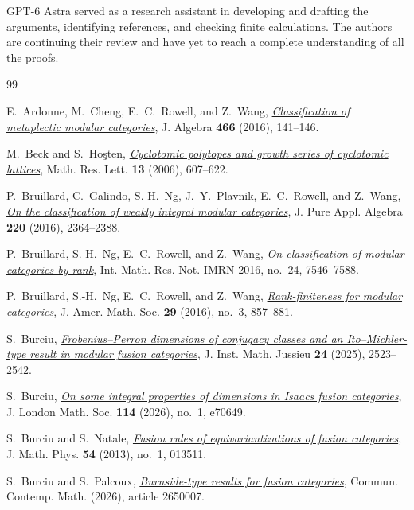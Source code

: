 \documentclass[11pt,a4paper]{article}
\numberwithin{equation}{section}
\theoremstyle{remark}
\begin{document}
GPT-6 Astra served as a research assistant in developing and drafting the arguments, identifying references, and checking finite calculations. The authors are continuing their review and have yet to reach a complete understanding of all the proofs.

\begin{thebibliography}{99}\small{}
E.~Ardonne, M.~Cheng, E.~C.~Rowell, and Z.~Wang,
\href{https://doi.org/10.1016/j.jalgebra.2016.08.001}{\emph{Classification of metaplectic modular categories}},
J. Algebra \textbf{466} (2016), 141--146.

M.~Beck and S.~Ho\c{s}ten, \href{https://doi.org/10.4310/mrl.2006.v13.n4.a10}{\emph{Cyclotomic polytopes and growth series of cyclotomic lattices}}, Math. Res. Lett. \textbf{13} (2006), 607--622.

P.~Bruillard, C.~Galindo, S.-H.~Ng, J.~Y.~Plavnik, E.~C.~Rowell,
and Z.~Wang,
\href{https://doi.org/10.1016/j.jpaa.2015.11.010}{\emph{On the classification of weakly integral modular categories}},
J. Pure Appl. Algebra \textbf{220} (2016), 2364--2388.

P.~Bruillard, S.-H.~Ng, E.~C.~Rowell, and Z.~Wang,
\href{https://doi.org/10.1093/imrn/rnw020}{\emph{On classification of modular categories by rank}},
Int. Math. Res. Not. IMRN 2016, no.~24, 7546--7588.

P.~Bruillard, S.-H.~Ng, E.~C.~Rowell, and Z.~Wang,
\href{https://doi.org/10.1090/jams/842}{\emph{Rank-finiteness for modular categories}},
J. Amer. Math. Soc. \textbf{29} (2016), no.~3, 857--881.

S.~Burciu,
\href{https://doi.org/10.1017/S1474748025101126}{\emph{Frobenius--Perron dimensions of conjugacy classes and an
Ito--Michler-type result in modular fusion categories}},
J. Inst. Math. Jussieu \textbf{24} (2025), 2523--2542.

S.~Burciu,
\href{https://doi.org/10.1112/jlms.70649}{\emph{On some integral properties of dimensions in Isaacs fusion categories}},
J. London Math. Soc. \textbf{114} (2026), no.~1, e70649.

S.~Burciu and S.~Natale,
\href{https://doi.org/10.1063/1.4774293}{\emph{Fusion rules of equivariantizations of fusion categories}},
J. Math. Phys. \textbf{54} (2013), no.~1, 013511.

S.~Burciu and S.~Palcoux,
\href{https://doi.org/10.1142/S0219199726500070}{\emph{Burnside-type results for fusion categories}},
Commun. Contemp. Math. (2026), article 2650007.


\end{thebibliography}
\end{document}
